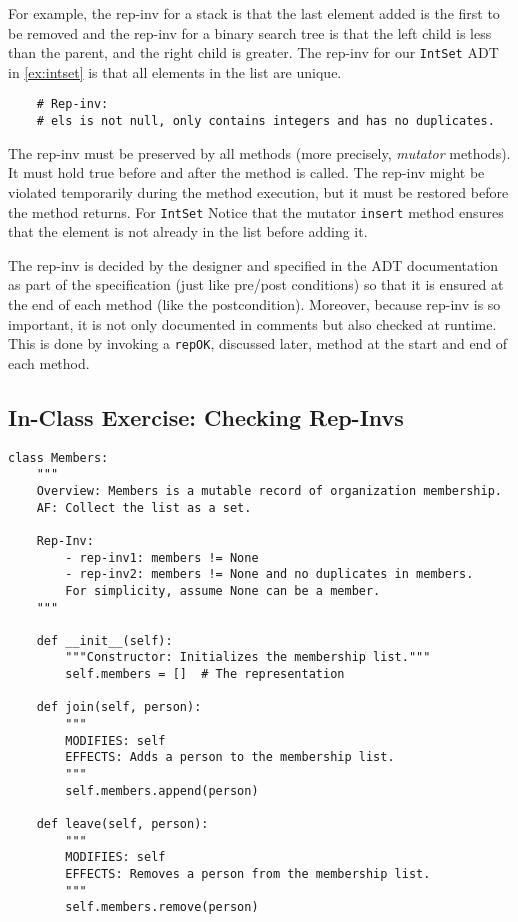 \documentclass[oneside,11pt,dvipsnames]{book}
\newcommand{\code}[1]{\texttt{#1}}
\begin{document}
For example, the rep-inv for a stack is that the last element added is the first to be removed and the rep-inv for a binary search tree is that the left child is less than the parent, and the right child is greater. 
The rep-inv for our \code{IntSet} ADT in \autoref{ex:intset} is that all elements in the list are unique. 
\begin{lstlisting}
    # Rep-inv:
    # els is not null, only contains integers and has no duplicates.
\end{lstlisting}

The rep-inv must be preserved by all methods (more precisely, \emph{mutator} methods). It must hold true before and after the method is called. The rep-inv might be violated temporarily during the method execution, but it must be restored before the method returns. For \code{IntSet} Notice that the mutator \code{insert} method ensures that the element is not already in the list before adding it. 

The rep-inv is decided by the designer and specified in the ADT documentation as part of the specification (just like pre/post conditions) so that it is ensured at the end of each method (like the postcondition). Moreover, because rep-inv is so important, it is not only documented in comments but also checked at runtime.  This is done by invoking a \code{repOK}, discussed later, method at the start and end of each method.

\subsection{In-Class Exercise: Checking Rep-Invs}

\begin{lstlisting}
class Members:
    """
    Overview: Members is a mutable record of organization membership.
    AF: Collect the list as a set.
    
    Rep-Inv:
        - rep-inv1: members != None
        - rep-inv2: members != None and no duplicates in members.
        For simplicity, assume None can be a member.
    """

    def __init__(self):
        """Constructor: Initializes the membership list."""
        self.members = []  # The representation

    def join(self, person):
        """
        MODIFIES: self
        EFFECTS: Adds a person to the membership list.
        """
        self.members.append(person)

    def leave(self, person):
        """
        MODIFIES: self
        EFFECTS: Removes a person from the membership list.
        """
        self.members.remove(person)
\end{lstlisting}
\end{document}
